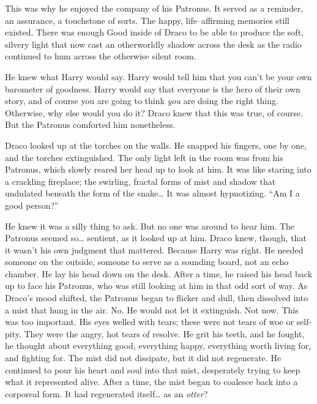 
This was why he enjoyed the company of his Patronus. It served as a reminder, an assurance, a touchstone of sorts. The happy, life\mbox{--}affirming memories still existed. There was enough Good inside of Draco to be able to produce the soft, silvery light that now cast an otherworldly shadow across the desk as the radio continued to hum across the otherwise silent room.

He knew what Harry would say. Harry would tell him that you can’t be your own barometer of goodness. Harry would say that everyone is the hero of their own story, and of course you are going to think \emph{you} are doing the right thing. Otherwise, why else would you do it? Draco knew that this was true, of course. But the Patronus comforted him nonetheless.

Draco looked up at the torches on the walls. He snapped his fingers, one by one, and the torches extinguished. The only light left in the room was from his Patronus, which slowly reared her head up to look at him. It was like staring into a crackling fireplace; the swirling, fractal forms of mist and shadow that undulated beneath the form of the snake… It was almost hypnotizing.
\SmallVSpace
“Am I a good person?”


He knew it was a silly thing to ask. But no one was around to hear him. The Patronus seemed so… sentient, as it looked up at him. Draco knew, though, that it wasn’t his own judgment that mattered. Because Harry was right. He needed someone on the outside, someone to serve as a sounding board, not an echo chamber. He lay his head down on the desk.
\SmallVSpace
After a time, he raised his head back up to face his Patronus, who was still looking at him in that odd sort of way. As Draco’s mood shifted, the Patronus began to flicker and dull, then dissolved into a mist that hung in the air. No. He would not let it extinguish. Not now. This was too important. His eyes welled with tears; these were not tears of woe or self-pity. They were the angry, hot tears of resolve.
\SmallVSpace
He grit his teeth, and he fought, he thought about everything good, everything happy, everything worth living for, and fighting for. The mist did not dissipate, but it did not regenerate. He continued to pour his heart and soul into that mist, desperately trying to keep what it represented alive. After a time, the mist began to coalesce back into a corporeal form.
\SmallVSpace
It had regenerated itself… as an \emph{otter}?

